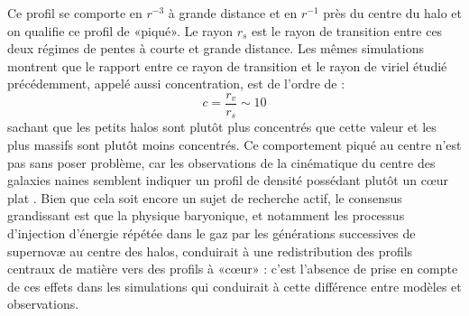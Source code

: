 Ce profil se comporte en $r^{-3}$ à grande distance et en $r^{-1}$ près du centre du halo et on qualifie ce profil de «piqué». Le rayon $r_s$ est le rayon de transition entre ces deux régimes de pentes à courte et grande distance. Les mêmes simulations montrent que le rapport entre ce rayon de transition et le rayon de viriel étudié précédemment, appelé aussi concentration, est de l'ordre de :
\begin{equation}
c=\frac{r_v}{r_s}\sim 10
\end{equation}
sachant que les petits halos sont plutôt plus concentrés que cette valeur et les plus massifs sont plutôt moins concentrés. Ce comportement piqué au centre n'est pas sans poser problème, car les observations de la cinématique du centre des galaxies naines semblent indiquer un profil de densité possédant plutôt un cœur plat . Bien que cela soit encore un sujet de recherche actif, le consensus grandissant est que la physique baryonique, et notamment les processus d'injection d'énergie répétée dans le gaz par les générations successives de supernovæ au centre des halos, conduirait à une redistribution des profils centraux de matière vers des profils à «cœur» : c'est l'absence de prise en compte de ces effets dans les simulations qui conduirait à cette différence entre modèles et observations.


